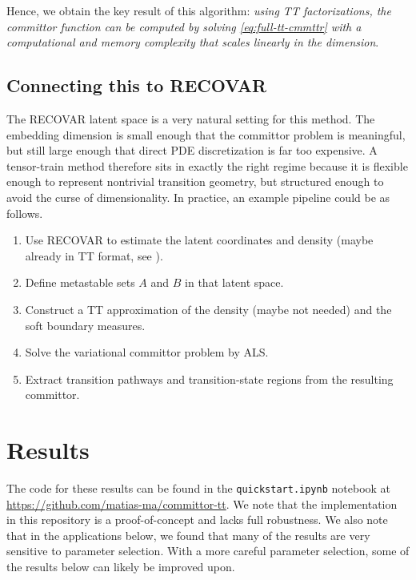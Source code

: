 \documentclass[11pt]{amsart}
\begin{document}
Hence, we obtain the key result of this algorithm: \emph{using TT factorizations, the committor function can be computed by solving \cref{eq:full-tt-cmmttr} with a computational and memory complexity that scales linearly in the dimension}.

\subsection{Connecting this to RECOVAR}
The RECOVAR latent space is a very natural setting for this method. The embedding dimension is small enough that the committor problem is meaningful, but still large enough that direct PDE discretization is far too expensive. A tensor-train method therefore sits in exactly the right regime because it is flexible enough to represent nontrivial transition geometry, but structured enough to avoid the curse of dimensionality. In practice, an example pipeline could be as follows.
\begin{enumerate}
    \item Use RECOVAR to estimate the latent coordinates and density (maybe already in TT format, see ).
    \item Define metastable sets $A$ and $B$ in that latent space.
    \item Construct a TT approximation of the density (maybe not needed) and the soft boundary measures.
    \item Solve the variational committor problem by ALS.
    \item Extract transition pathways and transition-state regions from the resulting committor.
\end{enumerate}

\section{Results}
The code for these results can be found in the \texttt{quickstart.ipynb} notebook at \url{https://github.com/matias-ma/committor-tt}. We note that the implementation in this repository is a proof-of-concept and lacks full robustness. We also note that in the applications below, we found that many of the results are very sensitive to parameter selection. With a more careful parameter selection, some of the results below can likely be improved upon.
\end{document}
